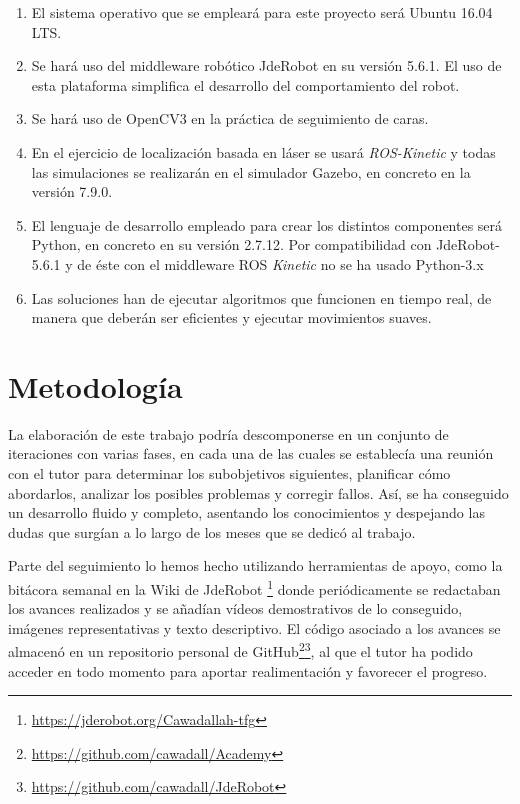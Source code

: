 \begin{enumerate}
	\item El sistema operativo que se empleará para este proyecto será Ubuntu 16.04 LTS.
	\item Se hará uso del middleware robótico JdeRobot en su versión 5.6.1. El uso de esta plataforma simplifica el desarrollo del comportamiento del robot.
	\item Se hará uso de OpenCV3 en la práctica de seguimiento de caras.
	\item En el ejercicio de localización basada en láser se usará \textit{ROS-Kinetic} y todas las simulaciones se realizarán en el simulador Gazebo, en concreto en la versión 7.9.0. 
	\item El lenguaje de desarrollo empleado para crear los distintos componentes será Python, en concreto en su versión 2.7.12. Por compatibilidad con JdeRobot-5.6.1 y de éste con el middleware ROS \textit{Kinetic} no se ha usado Python-3.x
	\item Las soluciones han de ejecutar algoritmos que funcionen en tiempo real, de manera que deberán ser eficientes y ejecutar movimientos suaves.
\end{enumerate}

\section{Metodología}
La elaboración de este trabajo podría descomponerse en un conjunto de iteraciones con varias fases, en cada una de las cuales se establecía una reunión con el tutor para determinar los subobjetivos siguientes, planificar cómo abordarlos, analizar los posibles problemas y corregir fallos. Así, se ha conseguido un desarrollo fluido y completo, asentando los conocimientos y despejando las dudas que surgían a lo largo de los meses que se dedicó al trabajo.

Parte del seguimiento lo hemos hecho utilizando herramientas de apoyo, como la bitácora semanal en la Wiki de JdeRobot \footnote{\url{https://jderobot.org/Cawadallah-tfg}} donde periódicamente se redactaban los avances realizados y se añadían vídeos demostrativos de lo conseguido, imágenes representativas y texto descriptivo. El código asociado a los avances se almacenó en un repositorio personal de GitHub\footnote{\url{https://github.com/cawadall/Academy}}\footnote{\url{https://github.com/cawadall/JdeRobot}}, al que el tutor ha podido acceder en todo momento para aportar realimentación y favorecer el progreso.

